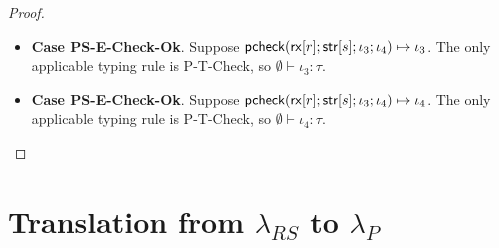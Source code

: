 \documentclass[11pt,leqno]{article}
\theoremstyle{definition}
\newcommand{\lambdas}{\lambda_{RS}}
\newcommand{\lambdap}{\lambda_P}
\newcommand{\tcheck}[4]{{\sf pcheck}(#1; #2; #3; #4)}
\renewcommand{\tstr}[1]{{{\sf str}[#1]}}
\newcommand{\rx}[1]{ {\sf rx}[#1] }
\begin{document}
\begin{proof}
\begin{itemize}[label=$ $,itemsep=1ex]
\item \textbf{Case PS-E-Check-Ok}.
Suppose $\tcheck{\rx{r}}{\tstr{s}}{\iota_3}{\iota_4} \mapsto \iota_3$. 
The only applicable typing rule is P-T-Check, so $\emptyset \vdash \iota_3 : \tau$.

\item \textbf{Case PS-E-Check-Ok}.
Suppose $\tcheck{\rx{r}}{\tstr{s}}{\iota_3}{\iota_4} \mapsto \iota_4$. 
The only applicable typing rule is P-T-Check, so $\emptyset \vdash \iota_4 : \tau$.

\end{itemize}



\end{proof}



\section{Translation from $\lambdas$ to $\lambdap$}
\end{document}
